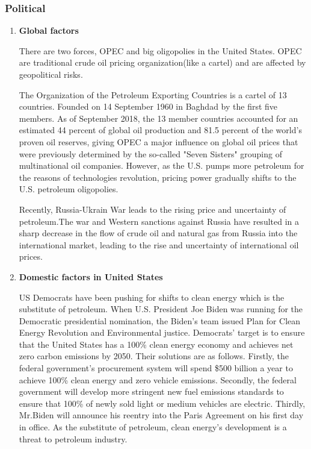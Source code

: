 \documentclass[
	a4paper, %
	12pt,%
]{CSSullivanBusinessReport}
\begin{document}
\begin{fullwidth}
\subsubsection{Political}
\begin{enumerate}
    \item \textbf{Global factors}
\par
There are two forces, OPEC and big oligopolies in the United States. OPEC are traditional crude oil pricing organization(like a cartel) and are affected by geopolitical risks. 
\par
The Organization of the Petroleum Exporting Countries is a cartel of 13 countries. Founded on 14 September 1960 in Baghdad by the first five members. As of September 2018, the 13 member countries accounted for an estimated 44 percent of global oil production and 81.5 percent of the world's proven oil reserves, giving OPEC a major influence on global oil prices that were previously determined by the so-called "Seven Sisters" grouping of multinational oil companies.  However, as the U.S. pumps more petroleum for the reasons of technologies revolution, pricing power gradually shifts to the U.S. petroleum oligopolies.
\par
Recently, Russia-Ukrain War leads to the rising price and uncertainty of petroleum.The war and Western sanctions against Russia have resulted in a sharp decrease in the flow of crude oil and natural gas from Russia into the international market, leading to the rise and uncertainty of international oil prices.

\item \textbf{Domestic factors in United States}
\par
US Democrats have been pushing for shifts to clean energy which is the substitute of petroleum. When U.S. President Joe Biden was running for the Democratic presidential nomination, the Biden’s team issued Plan for Clean Energy Revolution and Environmental justice. Democrats’ target is to ensure that the United States has a 100\% clean energy economy and achieves net zero carbon emissions by 2050. Their solutions are as follows. Firstly, the federal government's procurement system will spend \$500 billion a year to achieve 100\% clean energy and zero vehicle emissions. Secondly, the federal government will develop more stringent new fuel emissions standards to ensure that 100\% of newly sold light or medium vehicles are electric. Thirdly, Mr.Biden will announce his reentry into the Paris Agreement on his first day in office.
As the substitute of petroleum, clean energy’s development is a threat to petroleum industry.


\end{enumerate}
\end{fullwidth}
\end{document}
